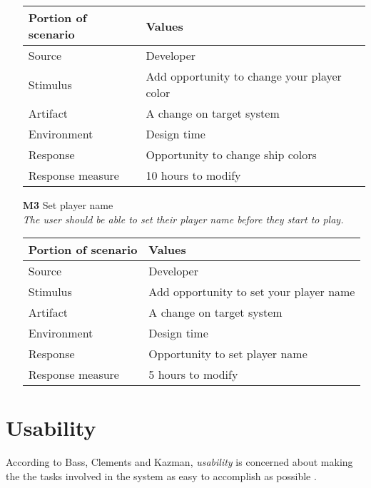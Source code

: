 \begin{itemize}
        \begin{tabular}{| l | l |}
            \hline
            \rowcolor[gray]{0.8}
            \textbf{Portion of scenario} & \textbf{Values} \\
            \hline
            Source & Developer \\
            Stimulus & Add opportunity to change your player color \\
            Artifact & A change on target system \\
            Environment & Design time \\
            Response & Opportunity to change ship colors  \\
            Response measure & 10 hours to modify \\
            \hline
        \end{tabular}
    
        \item[\textbf{M3}] Set player name \\
        \textit{\small{The user should be able to set their player name before they start to play.}}
        
        \begin{tabular}{| l | l |}
            \hline
            \rowcolor[gray]{0.8}
            \textbf{Portion of scenario} & \textbf{Values} \\
            \hline
            Source & Developer \\
            Stimulus & Add opportunity to set your player name \\
            Artifact & A change on target system \\
            Environment & Design time \\
            Response & Opportunity to set player name  \\
            Response measure & 5 hours to modify \\
            \hline
        \end{tabular}
    \end{itemize}



\section{Usability}
According to Bass, Clements and Kazman, \emph{usability} is concerned about making the the tasks involved in the system as easy to accomplish as possible \cite[p.~90]{pensum}.

